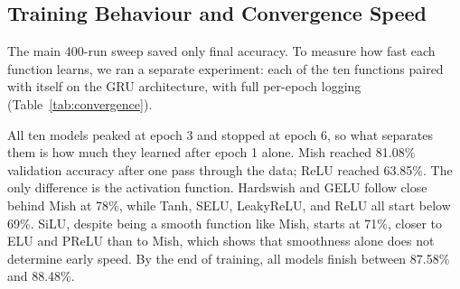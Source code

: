 \documentclass[conference]{IEEEtran}
\begin{document}
\subsection{Training Behaviour and Convergence Speed}

The main 400-run sweep saved only final accuracy. To
measure how fast each function learns, we ran a separate
experiment: each of the ten functions paired with itself on
the GRU architecture, with full per-epoch logging (Table~\ref{tab:convergence}).

All ten models peaked at epoch 3 and stopped at epoch 6, so
what separates them is how much they learned after epoch 1
alone. Mish reached 81.08\% validation accuracy after one pass
through the data; ReLU reached 63.85\%. The only difference
is the activation function. Hardswish and GELU follow close
behind Mish at 78\%, while Tanh, SELU, LeakyReLU, and
ReLU all start below 69\%. SiLU, despite being a smooth
function like Mish, starts at 71\%, closer to ELU and PReLU
than to Mish, which shows that smoothness alone does not
determine early speed. By the end of training, all models finish
between 87.58\% and 88.48\%.



\begin{table}[htbp]
  \caption{Empirical Convergence Profile (GRU, Homogeneous Pairs)}
  \label{tab:convergence}
  \centering\footnotesize
  \renewcommand{\arraystretch}{1.05}
\end{table}
\end{document}
